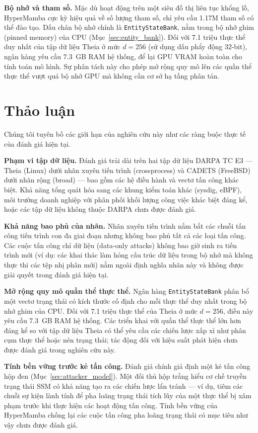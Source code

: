 \documentclass[letterpaper,twocolumn,10pt]{article}
\begin{document}
\textbf{Bộ nhớ và tham số.} Mặc dù hoạt động trên một siêu đồ thị liên tục khổng lồ, HyperMamba cực kỳ hiệu quả về số lượng tham số, chỉ yêu cầu 1.17M tham số có thể đào tạo. Dấu chân bộ nhớ chính là \texttt{EntityStateBank}, nằm trong bộ nhớ ghim (pinned memory) của CPU (Mục~\ref{sec:entity_bank}). Đối với 7.1 triệu thực thể duy nhất của tập dữ liệu Theia ở mức $d=256$ (sử dụng dấu phẩy động 32-bit), ngân hàng yêu cầu 7.3~GB RAM hệ thống, để lại GPU VRAM hoàn toàn cho tính toán mô hình. Sự phân tách này cho phép mở rộng quy mô lên các quần thể thực thể vượt quá bộ nhớ GPU mà không cần cơ sở hạ tầng phân tán.

\section{Thảo luận}
\label{sec:discussion}

Chúng tôi tuyên bố các giới hạn của nghiên cứu này như các ràng buộc thực tế của đánh giá hiện tại.

\textbf{Phạm vi tập dữ liệu.} Đánh giá trải dài trên hai tập dữ liệu DARPA TC E3 --- Theia (Linux) dưới nhãn xuyên tiến trình (crossprocess) và CADETS (FreeBSD) dưới nhãn rộng (broad) --- bao gồm các hệ điều hành và vectơ tấn công khác biệt. Khả năng tổng quát hóa sang các khung kiểm toán khác (sysdig, eBPF), môi trường doanh nghiệp với phân phối khối lượng công việc khác biệt đáng kể, hoặc các tập dữ liệu không thuộc DARPA chưa được đánh giá.

\textbf{Khả năng bao phủ của nhãn.} Nhãn xuyên tiến trình nắm bắt các chuỗi tấn công tiến trình con đa giai đoạn nhưng không bao phủ tất cả các loại tấn công. Các cuộc tấn công chỉ dữ liệu (data-only attacks) không bao giờ sinh ra tiến trình mới (ví dụ: các khai thác làm hỏng cấu trúc dữ liệu trong bộ nhớ mà không thực thi các tệp nhị phân mới) nằm ngoài định nghĩa nhãn này và không được giải quyết trong đánh giá hiện tại.

\textbf{Mở rộng quy mô quần thể thực thể.} Ngân hàng \texttt{EntityStateBank} phân bổ một vectơ trạng thái có kích thước cố định cho mỗi thực thể duy nhất trong bộ nhớ ghim của CPU. Đối với 7.1 triệu thực thể của Theia ở mức $d=256$, điều này yêu cầu 7.3~GB RAM hệ thống. Các triển khai với quần thể thực thể lớn hơn đáng kể so với tập dữ liệu Theia có thể yêu cầu các chiến lược xấp xỉ như phân cụm thực thể hoặc nén trạng thái; tác động đối với hiệu suất phát hiện chưa được đánh giá trong nghiên cứu này.

\textbf{Tính bền vững trước kẻ tấn công.} Đánh giá chính giả định một kẻ tấn công hộp đen (Mục~\ref{sec:attacker_model}). Một đối thủ hộp trắng hiểu cơ chế truyền trạng thái SSM có khả năng tạo ra các chiến lược lẩn tránh --- ví dụ, tiêm các chuỗi sự kiện lành tính để pha loãng trạng thái tích lũy của một thực thể bị xâm phạm trước khi thực hiện các hoạt động tấn công. Tính bền vững của HyperMamba chống lại các cuộc tấn công pha loãng trạng thái có mục tiêu như vậy chưa được đánh giá.
\end{document}
